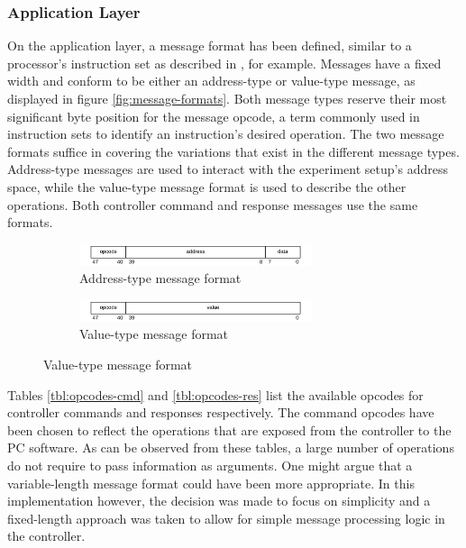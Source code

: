 \documentclass[main.tex]{subfiles}
\begin{document}
\subsubsection{Application Layer}

On the application layer, a message format has been defined, similar to a processor's instruction set as described in \cite{hennessy2013computer}, for example. Messages have a fixed width and conform to be either an address-type or value-type message, as displayed in figure \ref{fig:message-formats}.  Both message types reserve their most significant byte position for the message opcode, a term commonly used in instruction sets to identify an instruction's desired operation. The two message formats suffice in covering the variations that exist in the different message types. Address-type messages are used to interact with the experiment setup's address space, while the value-type message format is used to describe the other operations. Both controller command and response messages use the same formats. 

\begin{figure}[h]
    \centering
    \caption{Message formats for a controller with an address width of 32 and a data width of 8.}
    \label{fig:message-formats}    \begin{subfigure}[t]{\textwidth}
        \centering
        \caption{Address-type message format}
        \label{fig:message-format-address-typed}
        \includegraphics[width=0.75\textwidth]{img/message-format-address-typed}%
    \end{subfigure}
    \begin{subfigure}[t]{\textwidth}
        \centering
        \caption{Value-type message format}
        \label{fig:message-format-value-typed}
        \includegraphics[width=0.75\textwidth]{img/message-format-value-typed}%
    \end{subfigure}

\end{figure}

Tables \ref{tbl:opcodes-cmd} and \ref{tbl:opcodes-res} list the available opcodes for controller commands and responses respectively. The command opcodes have been chosen to reflect the operations that are exposed from the controller to the PC software. As can be observed from these tables, a large number of operations do not require to pass information as arguments. One might argue that a variable-length message format could have been more appropriate. In this implementation however, the decision was made to focus on simplicity and a fixed-length approach was taken to allow for simple message processing logic in the controller.
\end{document}
